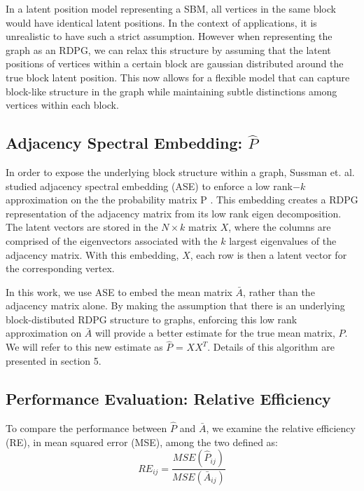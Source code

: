 In a latent position model representing a SBM, all vertices in the same block would have identical latent positions.  In the context of applications, it is unrealistic to have such a strict assumption.  However when representing the graph as an RDPG, we can relax this structure by assuming that the latent positions of vertices within a certain block are gaussian distributed around the true block latent position.  This now allows for a flexible model that can capture block-like structure in the graph while maintaining subtle distinctions among vertices within each block.

\subsection{Adjacency Spectral Embedding: $\hat{P}$}
In order to expose the underlying block structure within a graph, Sussman et. al. studied adjacency spectral embedding (ASE) to enforce a low rank$-k$ approximation on the the probability matrix P \cite{Sussman2012}.  This embedding creates a RDPG representation of the adjacency matrix from its low rank eigen decomposition.  The latent vectors are stored in the $N \times k$ matrix $X$, where the columns are comprised of the eigenvectors associated with the $k$ largest eigenvalues of the adjacency matrix.  With this embedding, $X$, each row is then a latent vector for the corresponding vertex.

In this work, we use ASE to embed the mean matrix $\bar{A}$, rather than the adjacency matrix alone.  By making the assumption that there is an underlying block-distibuted RDPG structure to graphs, enforcing this low rank approximation on $\bar{A}$ will provide a better estimate for the true mean matrix, $P$.  We will refer to this new estimate as $\hat{P}$ = $XX^T$.  Details of this algorithm are presented in section 5.

\subsection{Performance Evaluation: Relative Efficiency}
To compare the performance between $\hat{P}$ and $\bar{A}$, we examine the relative efficiency (RE), in mean squared error (MSE), among the two defined as:
\begin{equation}
RE_{ij} = \frac{MSE(\hat{P}_{ij})}{MSE(\bar{A}_{ij})}
\end{equation}

